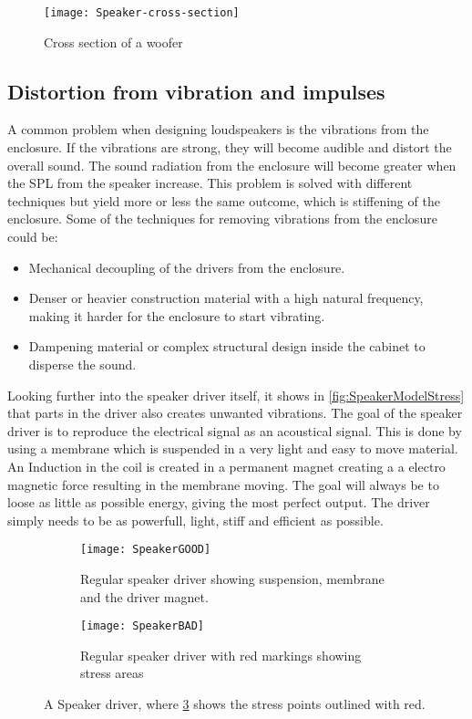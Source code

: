 \begin{figure}
\centering
\texttt{[image: Speaker-cross-section]}
\caption{Cross section of a woofer}
\label{fig:louderspeakerCrossSection}
\end{figure}





\subsection{Distortion from vibration and impulses}\label{subsec:impulses}

A common problem when designing loudspeakers is the vibrations from the enclosure. If the vibrations are strong, they will become audible and distort the overall sound. The sound radiation from the enclosure will become greater when the \gls{SPL} from the speaker increase. This problem is solved with different techniques but yield more or less the same outcome, which is stiffening of the enclosure. Some of the techniques for removing vibrations from the enclosure could be:
\begin{itemize}
\item Mechanical decoupling of the drivers from the enclosure.
\item Denser or heavier construction material with a high natural frequency, making it harder for the enclosure to start vibrating.
\item Dampening material or complex structural design inside the cabinet to disperse the sound.
\end{itemize}


Looking further into the speaker driver itself, it shows in \autoref{fig:SpeakerModelStress} that parts in the driver also creates unwanted vibrations. The goal of the speaker driver is to reproduce the electrical signal as an acoustical signal. This is done by using a membrane which is suspended in a very light and easy to move material. An Induction in the coil is created in a permanent magnet creating a a electro magnetic force resulting in the membrane moving. The goal will always be to loose as little as possible energy, giving the most perfect output. The driver simply needs to be as powerfull, light, stiff and efficient as possible.

\begin{figure}[H]
\centering
\begin{subfigure}[t]{0.47\textwidth}
\texttt{[image: SpeakerGOOD]}
	\caption{Regular speaker driver showing suspension, membrane and the driver magnet.}
	\label{fig:regularspeaker}
\end{subfigure}
\hspace{6mm} 
\begin{subfigure}[t]{0.47\textwidth}
\texttt{[image: SpeakerBAD]}
	\caption{Regular speaker driver with red markings showing stress areas}
	\label{fig:badspeaker}
\end{subfigure}
\caption{A Speaker driver, where \ref{fig:badspeaker} shows the stress points outlined with red.}
\label{fig:SpeakerModelStress}
\end{figure}

